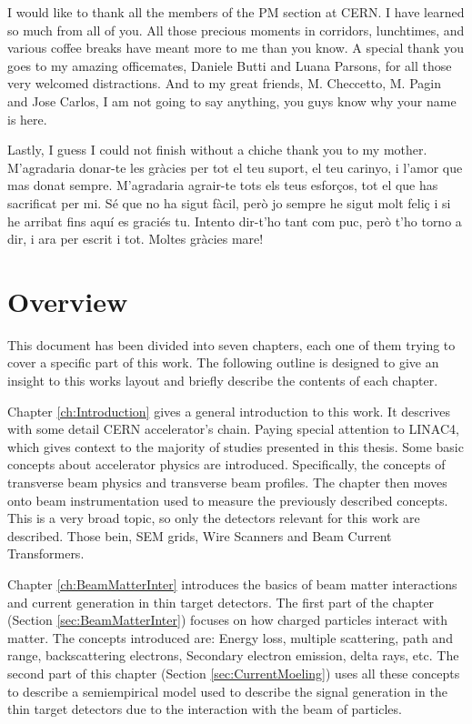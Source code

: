 I would like to thank all the members of the PM section at CERN. I have learned so much from all of you. All those precious moments in corridors, lunchtimes, and various coffee breaks have meant more to me than you know. A special thank you goes to my amazing officemates, Daniele Butti and Luana Parsons, for all those very welcomed distractions. And to my great friends, M. Checcetto, M. Pagin and Jose Carlos, I am not going to say anything, you guys know why your name is here. 

Lastly, I guess I could not finish without a chiche thank you to my mother. M'agradaria donar-te les gràcies per tot el teu suport, el teu carinyo, i l'amor que mas donat sempre. M'agradaria agrair-te tots els teus esforços, tot el que has sacrificat per mi. Sé que no ha sigut fàcil, però jo sempre he sigut molt feliç i si he arribat fins aquí es graciés tu. Intento dir-t'ho tant com puc, però t'ho torno a dir, i ara per escrit i tot. Moltes gràcies mare!

\tableofcontents
{}

\listoffigures
{}


\chapter*{Overview} \label{Overview}


This document has been divided into seven chapters, each one of them trying to cover a specific part of this work.  The following outline is designed to give an insight to this works layout and briefly describe the contents of each chapter.

Chapter \ref{ch:Introduction} gives a general introduction to this work. It descrives with some detail CERN accelerator's chain. Paying special attention to LINAC4, which gives context to the majority of studies presented in this thesis. Some basic concepts about accelerator physics are introduced. Specifically, the concepts of transverse beam physics and transverse beam profiles. The chapter then moves onto beam instrumentation used to measure the previously described concepts. This is a very broad topic, so only the detectors relevant for this work are described. Those bein, SEM grids, Wire Scanners and Beam Current Transformers.  


Chapter \ref{ch:BeamMatterInter} introduces the basics of beam matter interactions and current generation in thin target detectors. The first part of the chapter (Section \ref{sec:BeamMatterInter}) focuses on how charged particles interact with matter. The concepts introduced are: Energy loss, multiple scattering, path and range, backscattering electrons, Secondary electron emission, delta rays, etc. The second part of this chapter (Section \ref{sec:CurrentMoeling}) uses all these concepts to describe a semiempirical model used to describe the signal generation in the thin target detectors due to the interaction with the beam of particles. 

